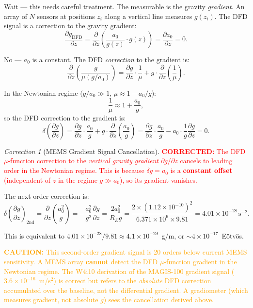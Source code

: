 \documentclass[11pt]{article}
\theoremstyle{definition}
\theoremstyle{remark}
\newtheorem{correction}[theorem]{Correction}
\newcommand{\ee}[1]{\times10^{#1}}
\newcommand{\azero}{a_0}
\newcommand{\corrected}[1]{\textcolor{red}{\textbf{CORRECTED:} #1}}
\newcommand{\caution}[1]{\textcolor{orange}{\textbf{CAUTION:} #1}}
\begin{document}
Wait --- this needs careful treatment. The measurable is the gravity
\emph{gradient}. An array of $N$ sensors at positions $z_i$ along a
vertical line measures $g(z_i)$. The DFD signal is a correction to
the gravity gradient:
\begin{equation}
\frac{\partial g_{\mathrm{DFD}}}{\partial z}
= \frac{\partial}{\partial z}\left(\frac{\azero}{g(z)} \cdot g(z)\right)
= \frac{\partial \azero}{\partial z} = 0.
\end{equation}

No --- $\azero$ is a constant. The DFD \emph{correction} to the
gradient is:
\begin{equation}
\frac{\partial}{\partial z}\left(\frac{g}{\mu(g/\azero)}\right)
= \frac{\partial g}{\partial z} \cdot \frac{1}{\mu}
+ g \cdot \frac{\partial}{\partial z}\left(\frac{1}{\mu}\right).
\end{equation}

In the Newtonian regime ($g/\azero \gg 1$, $\mu \approx 1 - \azero/g$):
\begin{equation}
\frac{1}{\mu} \approx 1 + \frac{\azero}{g},
\end{equation}
so the DFD correction to the gradient is:
\begin{equation}
\delta\left(\frac{\partial g}{\partial z}\right)
= \frac{\partial g}{\partial z} \cdot \frac{\azero}{g}
+ g \cdot \frac{\partial}{\partial z}\left(\frac{\azero}{g}\right)
= \frac{\partial g}{\partial z} \cdot \frac{\azero}{g}
- \azero \cdot \frac{1}{g}\frac{\partial g}{\partial z}
= 0.
\end{equation}

\begin{correction}[MEMS Gradient Signal Cancellation]
\label{cor:mems-gradient}
\corrected{The DFD $\mu$-function correction to the \emph{vertical
gravity gradient} $\partial g/\partial z$ cancels to leading order
in the Newtonian regime. This is because $\delta g = \azero$ is a
\textbf{constant offset} (independent of $z$ in the regime $g \gg \azero$),
so its gradient vanishes.}

The next-order correction is:
\begin{equation}
\delta\left(\frac{\partial g}{\partial z}\right)_{\mathrm{2nd}}
= \frac{\partial}{\partial z}\left(\frac{\azero^2}{g}\right)
= -\frac{\azero^2}{g^2}\frac{\partial g}{\partial z}
= \frac{2\azero^2}{R_E g}
= \frac{2 \times (1.12\ee{-10})^2}{6.371\ee{6} \times 9.81}
= 4.01\ee{-28}\,\mathrm{s}^{-2}.
\end{equation}

This is equivalent to $4.01\ee{-28}/9.81 \approx 4.1\ee{-29}$~g/m,
or $\sim 4\ee{-17}$~E\"otv\"os.

\caution{This second-order gradient signal is 20 orders below
current MEMS sensitivity. A MEMS array \textbf{cannot} detect the
DFD $\mu$-function gradient in the Newtonian regime. The W4i10
derivation of the MAGIS-100 gradient signal ($3.6\ee{-16}$~m/s$^2$)
is correct but refers to the \emph{absolute} DFD correction
accumulated over the baseline, not the differential gradient.
A gradiometer (which measures gradient, not absolute $g$) sees the
cancellation derived above.}
\end{correction}
\end{document}
